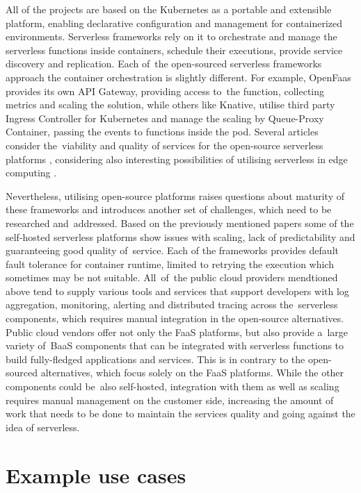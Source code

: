 All of the projects are based on the Kubernetes as a portable and extensible platform, enabling declarative configuration and management for containerized environments. Serverless frameworks rely on it to orchestrate and manage the serverless functions inside containers, schedule their executions, provide service discovery and replication. Each of~the open-sourced serverless frameworks approach the container orchestration is slightly different. For example, OpenFaas provides its own API Gateway, providing access to~the function, collecting metrics and scaling the solution, while others like Knative, utilise third party Ingress Controller for Kubernetes and manage the scaling by Queue-Proxy Container, passing the events to functions inside the pod. Several articles consider the~viability and quality of services for the open-source serverless platforms \cite{OpenSourceServelessPerformance}, considering also interesting possibilities of utilising serverless in edge computing \cite{OpenSourceServelessEdge}.

Nevertheless, utilising open-source platforms raises questions about maturity of these frameworks and introduces another set of challenges, which need to be researched and~addressed. Based on the previously mentioned papers some of the self-hosted serverless platforms show issues with scaling, lack of predictability and guaranteeing good quality of~service. Each of the frameworks provides default fault tolerance for container runtime, limited to retrying the execution which sometimes may be not suitable. All~of~the public cloud providers mendtioned above tend to supply various tools and services that support developers with log aggregation, monitoring, alerting and distributed tracing across the~serverless components, which requires manual integration in the open-source alternatives. Public cloud vendors offer not only the FaaS platforms, but also provide a~large variety of~BaaS components that can be integrated with serverless functions to build fully-fledged applications and services. This is in contrary to the open-sourced alternatives, which focus solely on the FaaS platforms. While the other components could be~also self-hosted, integration with them as well as scaling requires manual management on the customer side, increasing the amount of work that needs to be done to maintain the services quality and going against the idea of serverless.

\section{Example use cases} \label{chapter:serverless-example-use-cases}

